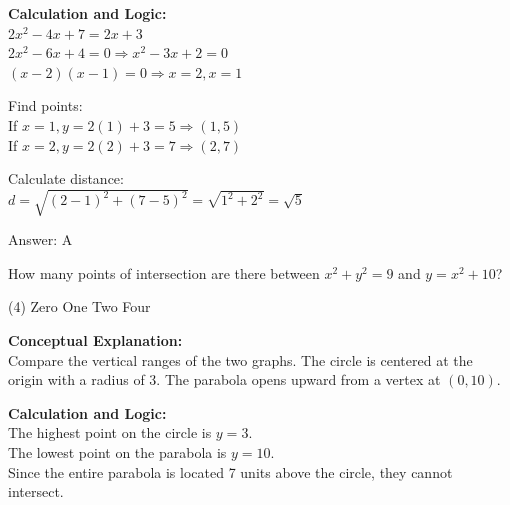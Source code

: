 \documentclass[11pt,paper=a4,answers]{exam}
\begin{document}
\begin{questions}
\begin{solution}
\vspace{20pt}

\textbf{Calculation and Logic:} \\
$2x^2 - 4x + 7 = 2x + 3$ \\
$2x^2 - 6x + 4 = 0 \Rightarrow x^2 - 3x + 2 = 0$ \\
$(x - 2)(x - 1) = 0 \Rightarrow x = 2, x = 1$

\vspace{10pt}

Find points: \\
If $x = 1, y = 2(1) + 3 = 5 \Rightarrow (1, 5)$ \\
If $x = 2, y = 2(2) + 3 = 7 \Rightarrow (2, 7)$

\vspace{10pt}

Calculate distance: \\
$d = \sqrt{(2-1)^2 + (7-5)^2} = \sqrt{1^2 + 2^2} = \sqrt{5}$

\vspace{25pt}

Answer: \colorbox{yellow!100}{A}
\end{solution}

\vspace{40pt}

\question
How many points of intersection are there between $x^2 + y^2 = 9$ and $y = x^2 + 10$?
\begin{tasks}(4)
    \task Zero
    \task One
    \task Two
    \task Four
\end{tasks}

\begin{solution}
\textbf{Conceptual Explanation:} \\
Compare the vertical ranges of the two graphs. The circle is centered at the origin with a radius of 3. The parabola opens upward from a vertex at $(0, 10)$.

\vspace{20pt}

\textbf{Calculation and Logic:} \\
The highest point on the circle is $y = 3$. \\
The lowest point on the parabola is $y = 10$. \\
Since the entire parabola is located 7 units above the circle, they cannot intersect.

\vspace{25pt}


\end{solution}
\end{questions}
\end{document}
